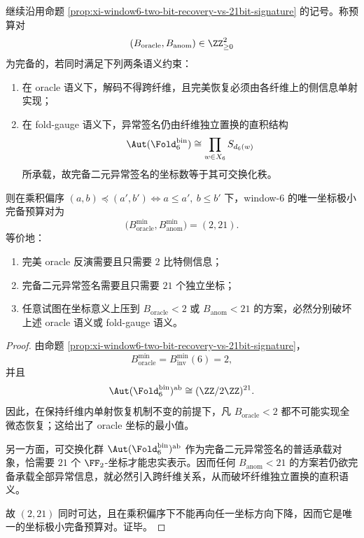 \begin{theorem}\label{thm:xi-window6-oracle-anomaly-coordinate-bifurcation}
继续沿用命题 \ref{prop:xi-window6-two-bit-recovery-vs-21bit-signature} 的记号。称预算对
\[
(B_{\mathrm{oracle}},B_{\mathrm{anom}})\in \ZZ_{\ge 0}^2
\]
为完备的，若同时满足下列两条语义约束：
\begin{enumerate}
  \item 在 oracle 语义下，解码不得跨纤维，且完美恢复必须由各纤维上的侧信息单射实现；
  \item 在 fold-gauge 语义下，异常签名仍由纤维独立置换的直积结构
  \[
  \Aut(\Fold_6^{\mathrm{bin}})
  \cong
  \prod_{w\in X_6}S_{d_6(w)}
  \]
  所承载，故完备二元异常签名的坐标数等于其可交换化秩。
\end{enumerate}
则在乘积偏序
\(
(a,b)\preceq(a',b')\iff a\le a',\ b\le b'
\)
下，window-\(6\) 的唯一坐标极小完备预算对为
\[
\boxed{\;
\bigl(B_{\mathrm{oracle}}^{\min},B_{\mathrm{anom}}^{\min}\bigr)
=
(2,21).\;}
\]
等价地：
\begin{enumerate}
  \item 完美 oracle 反演需要且只需要 \(2\) 比特侧信息；
  \item 完备二元异常签名需要且只需要 \(21\) 个独立坐标；
  \item 任意试图在坐标意义上压到 \(B_{\mathrm{oracle}}<2\) 或 \(B_{\mathrm{anom}}<21\) 的方案，必然分别破坏上述 oracle 语义或 fold-gauge 语义。
\end{enumerate}
\end{theorem}
\begin{proof}
由命题 \ref{prop:xi-window6-two-bit-recovery-vs-21bit-signature}，
\[
B_{\mathrm{oracle}}^{\min}=B_{\mathrm{inv}}^{\min}(6)=2,
\]
并且
\[
\Aut(\Fold_6^{\mathrm{bin}})^{\mathrm{ab}}\cong (\ZZ/2\ZZ)^{21}.
\]
因此，在保持纤维内单射恢复机制不变的前提下，凡 \(B_{\mathrm{oracle}}<2\) 都不可能实现全微态恢复；这给出了 oracle 坐标的最小值。

另一方面，可交换化群
\(
\Aut(\Fold_6^{\mathrm{bin}})^{\mathrm{ab}}
\)
作为完备二元异常签名的普适承载对象，恰需要 \(21\) 个 \(\FF_2\)-坐标才能忠实表示。因而任何 \(B_{\mathrm{anom}}<21\) 的方案若仍欲完备承载全部异常信息，就必然引入跨纤维关系，从而破坏纤维独立置换的直积语义。

故 \((2,21)\) 同时可达，且在乘积偏序下不能再向任一坐标方向下降，因而它是唯一的坐标极小完备预算对。证毕。
\end{proof}

\endinput
